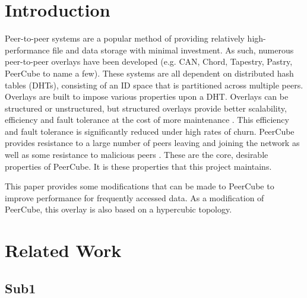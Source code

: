 \documentclass[apa6]{IEEEtran}
\begin{document}
\section{Introduction}
Peer-to-peer systems are a popular method of providing relatively high-performance file and data storage with minimal investment. As such, numerous peer-to-peer overlays have been developed (e.g. CAN\cite{ratnasamy2001scalable}, Chord\cite{stoica2001chord}, Tapestry\cite{zhao2001tapestry}, Pastry\cite{rowstron2001pastry}, PeerCube\cite{anceaume2008peercube} to name a few). These systems are all dependent on distributed hash tables (DHTs), consisting of an ID space that is partitioned across multiple peers. Overlays are built to impose various properties upon a DHT. Overlays can be structured or unstructured, but structured overlays provide better scalability, efficiency and fault tolerance at the cost of more maintenance \cite{locher2006equus}. This efficiency and fault tolerance is significantly reduced under high rates of churn. PeerCube provides resistance to a large number of peers leaving and joining the network as well as some resistance to malicious peers \cite{anceaume2008peercube}. These are the core, desirable properties of PeerCube. It is these properties that this project maintains.

This paper provides some modifications that can be made to PeerCube to improve performance for frequently accessed data. As a modification of PeerCube, this overlay is also based on a hypercubic topology. 


\section{Related Work}

\blindtext
\blindtext
\blindtext
\blindtext



\subsection{Sub1}
\blindtext


%
%
\end{document}
